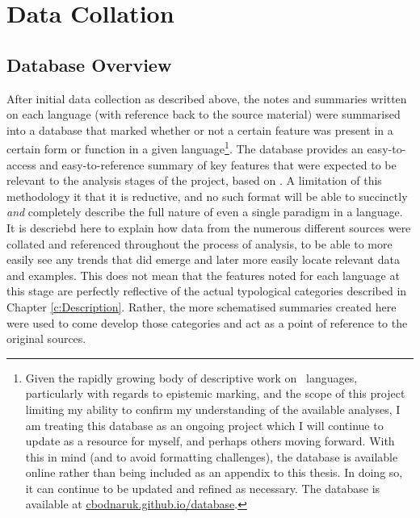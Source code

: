 \section{Data Collation}\label{s:Methods:Schema}
\subsection{Database Overview}
After initial data collection as described above, the notes and summaries written on each language (with reference back to the source material) were summarised into a database that marked whether or not a certain feature was present in a certain form or function in a given language\footnote{Given the rapidly growing body of descriptive work on \lfam\ languages, particularly with regards to epistemic marking, and the scope of this project limiting my ability to confirm my understanding of the available analyses, I am treating this database as an ongoing project which I will continue to update as a resource for myself, and perhaps others moving forward. With this in mind (and to avoid formatting challenges), the database is available online rather than being included as an appendix to this thesis. In doing so, it can continue to be updated and refined as necessary. The database is available at \url{cbodnaruk.github.io/database}.}. The database provides an easy-to-access and easy-to-reference summary of key features that were expected to be relevant to the analysis stages of the project, based on .  A limitation of this methodology it that it is reductive, and no such format will be able to succinctly \textit{and} completely describe the full nature of even a single paradigm in a language. It is descriebd here to explain how data from the numerous different sources were collated and referenced throughout the process of analysis, to be able to more easily see any trends that did emerge and later more easily locate relevant data and examples. This does not mean that the features noted for each language at this stage are perfectly reflective of the actual typological categories described in Chapter \ref{c:Description}. Rather, the more schematised summaries created here were used to come develop those categories and act as a point of reference to the original sources.

